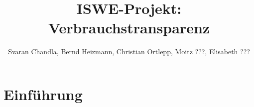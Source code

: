 \documentclass{article}
\begin{document}
\title{ISWE-Projekt: Verbrauchstransparenz}
\author{Svaran Chandla, Bernd Heizmann, Christian Ortlepp, Moitz ???, Elisabeth ???}
\maketitle   


\section{Einführung}
	
\end{document}
